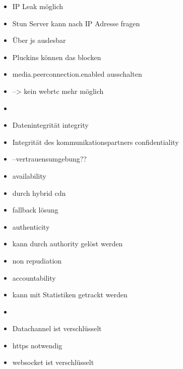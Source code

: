 \begin{itemize}
	\item IP Leak möglich
	\item Stun Server kann nach IP Adresse fragen
	\item Über js auslesbar
	\item Pluckins können das blocken
	\item media.peerconnection.enabled ausschalten
	\item --> kein webrtc mehr möglich
	\item 
	\item Datenintegrität integrity
	\item Integrität des kommunikationspartners confidentiality
	\item 	--vertrauensumgebung??
	\item availability
	\item durch hybrid cdn 
	\item fallback lösung
	\item authenticity
	\item kann durch authority gelöst werden
	\item non repudiation
	\item accountability
	\item kann mit Statistiken getrackt werden
	\item 
	\item Datachannel ist verschlüsselt
	\item https notwendig
	\item websocket ist verschlüsselt

\end{itemize}

%
%
%


